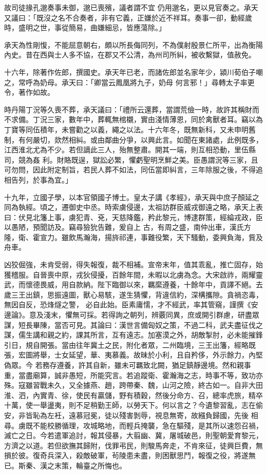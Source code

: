\begin{pinyinscope}
 故司徒掾孔邈奏事未御，邈已喪殯，議者謂不宜
 仍用邈名，更以見官奏之。承天又議曰：「既沒之名不合奏者，非有它義，正嫌於近不祥耳。奏事一卻，動經歲時，盛明之世，事從簡易，曲嫌細忌，皆應蕩除。」



 承天為性剛愎，不能屈意朝右，頗以所長侮同列，不為僕射殷景仁所平，出為衡陽內史。昔在西與士人多不協，在郡又不公清，為州司所糾，被收繫獄，值赦免。



 十六年，除著作佐郎，撰國史。承天年已老，而諸佐郎並名家年少，潁川荀伯子嘲之，常呼為奶母。承天曰：「卿當云鳳凰將九子，奶母
 何言邪！」尋轉太子率更令，著作如故。



 時丹陽丁況等久喪不葬，承天議曰：「禮所云還葬，當謂荒儉一時，故許其稱財而不求備。丁況三家，數年中，葬輒無棺櫬，實由淺情薄恩，同於禽獸者耳。竊以為丁寶等同伍積年，未嘗勸之以義，繩之以法。十六年冬，既無新科，又未申明舊制，有何嚴切，欻然相糾。或由鄰曲分爭，以興此言。如聞在東諸處，此例既多，江西淮北尤為不少。若但謫此三人，殆無整肅。開其一端，則互相恐動，里伍縣司，競為姦
 利。財賂既逞，獄訟必繁，懼虧聖明烹鮮之美。臣愚謂況等三家，且可勿問，因此附定制旨，若民人葬不如法，同伍當即糾言，三年除服之後，不得追相告列，於事為宜。」



 十九年，立國子學，以本官領國子博士。皇太子講《孝經》，承天與中庶子顏延之同為執經。頃之，遷御史中丞。時索虜侵邊，太祖訪群臣威戎御遠之略，承天上表曰：伏見北籓上事，虜犯青、兗，天慈降鑑，矜此黎元，博逮群策，經綸戎政，臣以愚陋，預聞訪及。竊尋獫狁告難，爰自上
 古，有周之盛，南仲出車，漢氏方隆，衛、霍宣力。雖飲馬瀚海，揚旍祁連，事難役繁，天下騷動，委興負海，貲及舟車。



 凶狡倔強，未肯受弱，得失報復，裁不相補。宣帝末年，值其乖亂，推亡固存，始獲稽服。自晉喪中原，戎狄侵擾，百餘年間，未暇以北虜為念。大宋啟祚，兩耀靈武，而懷德畏威，用自款納。陛下臨御以來，羈縻遵養，十餘年中，貢譯不絕。去歲三王出鎮，思振遠圖，獸心易駭，遂生猜懼，背違信約，深構攜隙。貪禍恣毒，無因自反，恐烽燧之警，
 必自此始。臣素庸懦，才不經武，率其管窺，謹撰《安邊論》。意及淺末，懼無可採。若得詢之朝列，辨覈同異，庶或開引群慮，研盡眾謀，短長畢陳，當否可見。其論曰：漢世言備匈奴之策，不過二科，武夫盡征伐之謀，儒生講和親之約，課其所言，互有遠志。加塞漠之外，胡敵掣肘，必未能摧鋒引日，規自開張。當由往年冀土之民，附化者眾，二州臨境，三王出籓，經略既張，宏圖將舉，士女延望，華、夷慕義。故昧於小利，且自矜侈，外示餘力，內堅偽眾。今
 若務存遵養，許其自新，雖未可羈致北闕，猶足鎮靜邊境。然和親事重，當盡廟算，誠非愚短，所能究言。若追蹤衛、霍瀚海之志，時事不等，致功亦殊。寇雖習戰未久，又全據燕、趙，跨帶秦、魏，山河之險，終古如一。自非大田淮、泗，內實青、徐，使民有贏儲，野有積穀，然後分命方、召，總率虎旅，精卒十萬，使一舉盪夷，則不足稍勤王師，以勞天下。何以言之？今遺黎習亂，志在偷安，非皆恥為左衽，遠慕冠冕，徒以殘害剝辱，視息無寄，故繦負歸國，先後
 相尋。虜既不能校勝循理，攻城略地，而輕兵掩襲，急在驅殘，是其所以速怨召禍，滅亡之日。今若遣軍追討，報其侵暴，大翦幽、冀，屠城破邑，則聖朝愛育黎元，方濟之以道。若但欲撫其歸附，伐罪弔民，則駿馬奔走，不肯來征，徒興巨費，無損於彼。復奇兵深入，殺敵破軍，茍陵患未盡，則困獸思鬥，報復之役，將遂無已。斯秦、漢之末策，輪臺之所悔也。




\end{pinyinscope}
